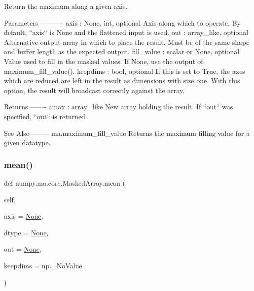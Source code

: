 \begin{DoxyVerb}Return the maximum along a given axis.

Parameters
----------
axis : {None, int}, optional
    Axis along which to operate.  By default, ``axis`` is None and the
    flattened input is used.
out : array_like, optional
    Alternative output array in which to place the result.  Must
    be of the same shape and buffer length as the expected output.
fill_value : scalar or None, optional
    Value used to fill in the masked values.
    If None, use the output of maximum_fill_value().
keepdims : bool, optional
    If this is set to True, the axes which are reduced are left
    in the result as dimensions with size one. With this option,
    the result will broadcast correctly against the array.

Returns
-------
amax : array_like
    New array holding the result.
    If ``out`` was specified, ``out`` is returned.

See Also
--------
ma.maximum_fill_value
    Returns the maximum filling value for a given datatype.\end{DoxyVerb}
 \mbox{\label{classnumpy_1_1ma_1_1core_1_1MaskedArray_a5dce98d54c0614fa9a4a78779b7d7971}} 
\subsubsection{\texorpdfstring{mean()}{mean()}}
{\footnotesize\ttfamily def numpy.\+ma.\+core.\+Masked\+Array.\+mean (\begin{DoxyParamCaption}\item[{}]{self,  }\item[{}]{axis = {\ttfamily \hyperlink{namespacenumpy_1_1ma_1_1core_a647ee1848dfa3692fe35a663a2aa40b3}{None}},  }\item[{}]{dtype = {\ttfamily \hyperlink{namespacenumpy_1_1ma_1_1core_a647ee1848dfa3692fe35a663a2aa40b3}{None}},  }\item[{}]{out = {\ttfamily \hyperlink{namespacenumpy_1_1ma_1_1core_a647ee1848dfa3692fe35a663a2aa40b3}{None}},  }\item[{}]{keepdims = {\ttfamily np.\+\_\+NoValue} }\end{DoxyParamCaption})}

